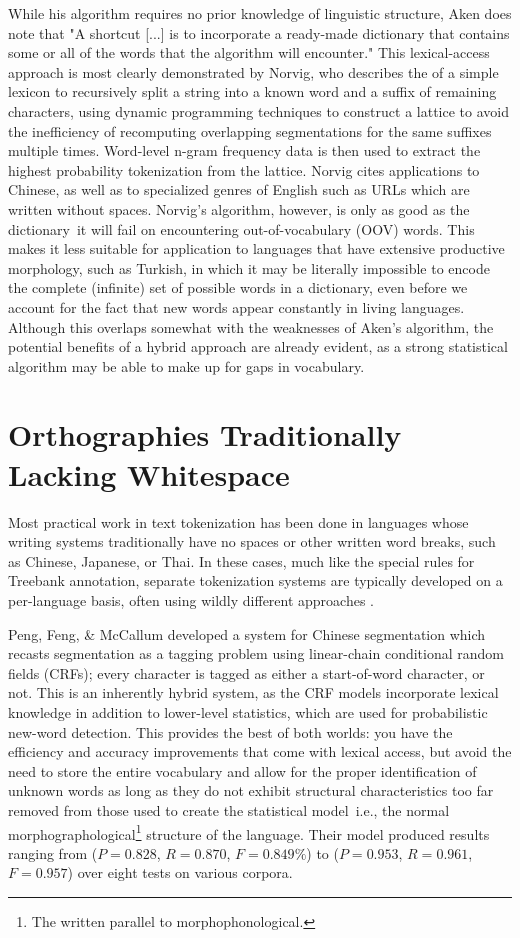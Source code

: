 While his algorithm requires no prior knowledge of linguistic structure, Aken\cite{aken11} does note that "A shortcut [...] is to incorporate a ready-made dictionary that contains some or all of the words that the algorithm will encounter." This lexical-access approach is most clearly demonstrated by Norvig\cite{norvig14}, who describes the of a simple lexicon to recursively split a string into a known word and a suffix of remaining characters, using dynamic programming techniques to construct a lattice to avoid the inefficiency of recomputing overlapping segmentations for the same suffixes multiple times. Word-level n-gram frequency data is then used to extract the highest probability tokenization from the lattice. Norvig\cite{norvig14} cites applications to Chinese, as well as to specialized genres of English such as URLs which are written without spaces.
Norvig's algorithm, however, is only as good as the dictionary\textemdash~it will fail on encountering out-of-vocabulary (OOV) words. This makes it less suitable for application to languages that have extensive productive morphology, such as Turkish, in which it may be literally impossible to encode the complete (infinite) set of possible words in a dictionary, even before we account for the fact that new words appear constantly in living languages\cite{islam07}. Although this overlaps somewhat with the weaknesses of Aken's algorithm, the potential benefits of a hybrid approach are already evident, as a strong statistical algorithm may be able to make up for gaps in vocabulary.

\section{Orthographies Traditionally Lacking Whitespace}
Most practical work in text tokenization has been done in languages whose writing systems traditionally have no spaces or other written word breaks, such as Chinese, Japanese, or Thai. In these cases, much like the special rules for Treebank annotation, separate tokenization systems are typically developed on a per-language basis, often using wildly different approaches \cite{peng04} \cite{suzuki00}.

Peng, Feng, \& McCallum\cite{peng04} developed a system for Chinese segmentation which recasts segmentation as a tagging problem using linear-chain conditional random fields (CRFs); every character is tagged as either a start-of-word character, or not. This is an inherently hybrid system, as the CRF models incorporate lexical knowledge in addition to lower-level statistics, which are used for probabilistic new-word detection. This provides the best of both worlds: you have the efficiency and accuracy improvements that come with lexical access, but avoid the need to store the entire vocabulary and allow for the proper identification of unknown words as long as they do not exhibit structural characteristics too far removed from those used to create the statistical model\textemdash~i.e., the normal morphographological\footnote{The written parallel to morphophonological.} structure of the language. Their model produced results ranging from ($P = 0.828$, $R = 0.870$, $F = 0.849\%$) to ($P = 0.953$, $R = 0.961$, $F = 0.957$) over eight tests on various corpora.

